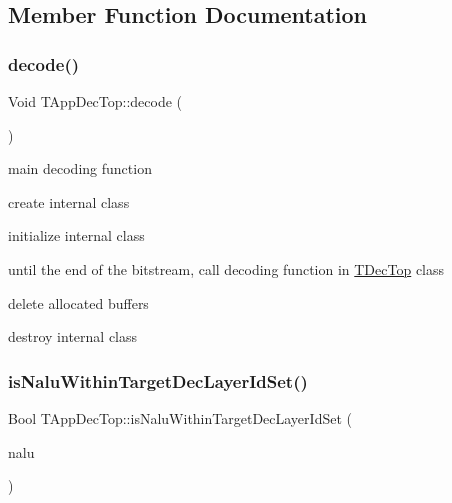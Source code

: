 \subsection{Member Function Documentation}
\mbox{\label{class_t_app_dec_top_ac637a3c06eba887ddc200069b652628d}} 
\subsubsection{\texorpdfstring{decode()}{decode()}}
{\footnotesize\ttfamily Void T\+App\+Dec\+Top\+::decode (\begin{DoxyParamCaption}{ }\end{DoxyParamCaption})}



main decoding function 


\begin{DoxyItemize}
\item create internal class
\item initialize internal class
\item until the end of the bitstream, call decoding function in \hyperlink{class_t_dec_top}{T\+Dec\+Top} class
\item delete allocated buffers
\item destroy internal class
\end{DoxyItemize}\mbox{\label{class_t_app_dec_top_abd617b847de5611ff3d355ddbf580690}} 
\subsubsection{\texorpdfstring{is\+Nalu\+Within\+Target\+Dec\+Layer\+Id\+Set()}{isNaluWithinTargetDecLayerIdSet()}}
{\footnotesize\ttfamily Bool T\+App\+Dec\+Top\+::is\+Nalu\+Within\+Target\+Dec\+Layer\+Id\+Set (\begin{DoxyParamCaption}\item[{\hyperlink{class_input_n_a_l_unit}{Input\+N\+A\+L\+Unit} $\ast$}]{nalu }\end{DoxyParamCaption})\hspace{0.3cm}{\ttfamily [protected]}}



